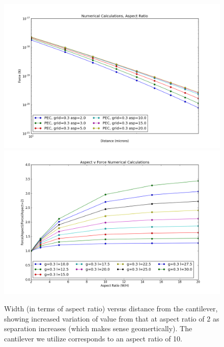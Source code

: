 \documentclass[11pt]{article}
\begin{document}
\begin{figure}[h]
\centering
\includegraphics[width=5in]{force_v_aspect}
\includegraphics[width=5in]{aspect_correction}
\caption{Width (in terms of aspect ratio) versus distance from the cantilever, showing increased variation of value from that at aspect ratio of 2 as separation increases (which makes sense geomertically). The cantilever we utilize corresponds to an aspect ratio of 10.}\label{fig:aspect}
\end{figure}
\end{document}
